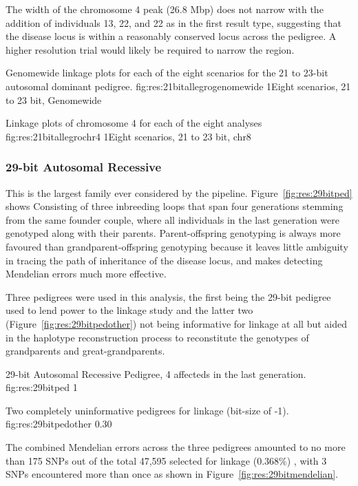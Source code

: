 The width of the chromosome 4 peak (26.8 Mbp) does not narrow with the addition of individuals 13, 22, and 22 as in the first result type, suggesting that the disease locus is within a reasonably conserved locus across the pedigree. A higher resolution trial would likely be required to narrow the region.

	{Genomewide linkage plots for each of the eight scenarios for the 21 to 23-bit autosomal dominant pedigree.}
	{fig:res:21bitallegrogenomewide}
	{1}{Eight scenarios, 21 to 23 bit, Genomewide}
	
	
	{Linkage plots of chromosome 4 for each of the eight analyses}
	{fig:res:21bitallegrochr4}
	{1}{Eight scenarios, 21 to 23 bit, chr8}


\subsubsection{29-bit Autosomal Recessive}
This is the largest family ever considered by the pipeline. Figure~\ref{fig:res:29bitped}  shows  Consisting of three inbreeding loops  that span four generations stemming from the same founder couple, where all individuals in the last generation were genotyped along with their parents. Parent-offspring genotyping is always more favoured than grandparent-offspring genotyping because it leaves little ambiguity in tracing the path of inheritance of the disease locus, and makes detecting Mendelian errors much more effective. 

Three pedigrees were used in this analysis, the first being the 29-bit pedigree used to lend power to the linkage study and the latter two (Figure~\ref{fig:res:29bitpedother}) not being informative for linkage at all but aided in the haplotype reconstruction process to reconstitute the genotypes of grandparents and great-grandparents.

	{29-bit Autosomal Recessive Pedigree, 4 affecteds in the last generation.}
	{fig:res:29bitped}
	{1}{}

	{Two completely uninformative pedigrees for linkage (bit-size of -1).}
	{fig:res:29bitpedother}
	{0.30}{}

The combined Mendelian errors across the three pedigrees amounted to no more than 175 SNPs out of the total 47,595 selected for linkage (0.368\%) , with 3 SNPs encountered more than once as shown in Figure~\ref{fig:res:29bitmendelian}.

